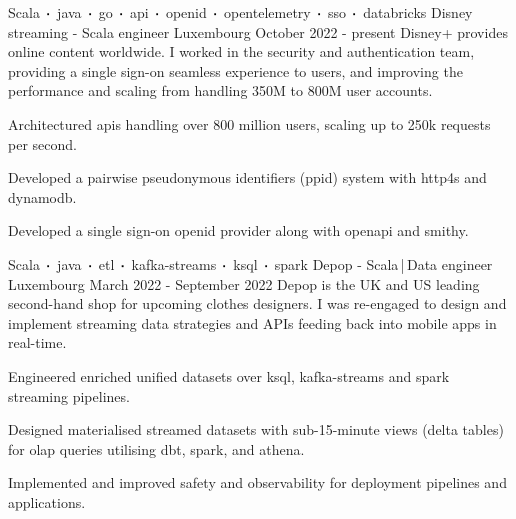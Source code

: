 
\newcommand*{\logo}[2]{\raisebox{-0.2em}{\texttt{[image: \#2]}}\hspace{0.25em}#1}
\newcommand*{\logoonly}[1]{\raisebox{-0.2em}{\texttt{[image: \#1]}}}

\begin{cventries}
    \cventry
    {Scala$\sqbig$java$\sqbig$go$\sqbig$api$\sqbig$openid$\sqbig$opentelemetry$\sqbig$sso$\sqbig$databricks}
    {\logo{Disney streaming}{../../../images/disney.png} - Scala engineer}
    {Luxembourg}
    {October 2022 - present}
    {Disney+ provides online content worldwide. I worked in the security and authentication team, providing a single sign-on seamless experience to users, and improving the performance and scaling from handling 350M to 800M user accounts.}
    {
        \begin{cvitems}
            \item{Architectured apis handling over 800 million users, scaling up to 250k requests per second.}
            \item{Developed a pairwise pseudonymous identifiers (ppid) system with http4s and dynamodb.}
            \item{Developed a single sign-on openid provider along with openapi and smithy.}
        \end{cvitems}
    }

    \cventry
    {Scala$\sqbig$java$\sqbig$etl$\sqbig$kafka-streams$\sqbig$ksql$\sqbig$spark}
    {\logo{Depop}{../../../images/depop.jpg} - Scala\,|\,Data engineer}
    {Luxembourg}
    {March 2022 - September 2022}
    {Depop is the UK and US leading second-hand shop for upcoming clothes designers. I was re-engaged to design and implement streaming data strategies and APIs feeding back into mobile apps in real-time.}
    {
        \begin{cvitems}
            \item{Engineered enriched unified datasets over ksql, kafka-streams and spark streaming pipelines.}
            \item{Designed materialised streamed datasets with sub-15-minute views (delta tables) for olap queries utilising dbt, spark, and athena.}
            \item{Implemented and improved safety and observability for deployment pipelines and applications.}
        \end{cvitems}
    }


\end{cventries}
